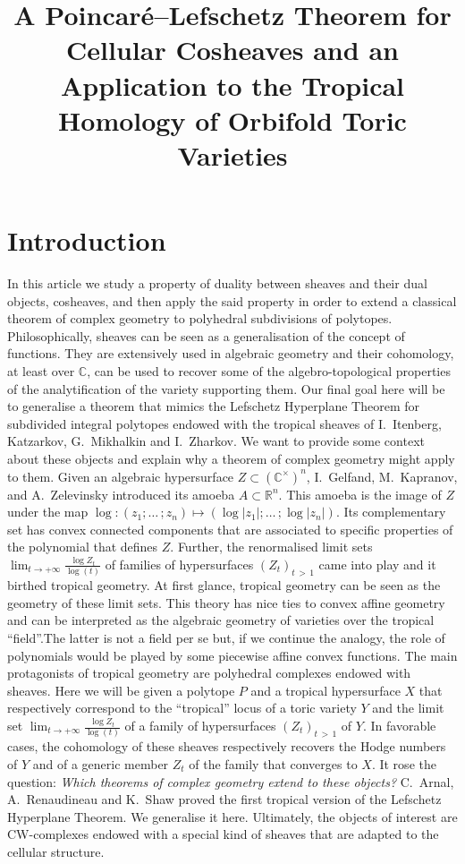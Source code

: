 \documentclass[AHL,Unicode,longabstracts,published]{cedram}
\title[Poincaré--Lefschetz duality and Tropical Homology]{A Poincaré--Lefschetz Theorem for Cellular Cosheaves and an Application to the Tropical Homology of Orbifold Toric Varieties}
\author[\initial{J.} \lastname{Chenal}]{\firstname{Jules} \lastname{Chenal}}
\newcommand{\C}{\mathbb{C}}
\newcommand{\R}{\mathbb{R}}
\begin{document}
\maketitle

\section{Introduction}

In this article we study a property of duality between sheaves and their dual objects, cosheaves, and then apply the said property in order to extend a classical theorem of complex geometry to polyhedral subdivisions of polytopes. Philosophically, sheaves can be seen as a generalisation of the concept of functions. They are extensively used in algebraic geometry and their cohomology, at least over $\C$, can be used to recover some of the algebro-topological properties of the analytification of the variety supporting them. Our final goal here will be to generalise a theorem that mimics the Lefschetz Hyperplane Theorem for subdivided integral polytopes endowed with the tropical sheaves of I.~Itenberg, Katzarkov, G.~Mikhalkin and I.~Zharkov.\linebreak
We want to provide some context about these objects and explain why a theorem of complex geometry might apply to them. Given an algebraic hypersurface $Z\subset(\C^\times)^n$, I.~Gelfand, M.~Kapranov, and A.~Zelevinsky introduced its amoeba $A\subset\R^n$. This amoeba is the image of $Z$ under the map $\log:(z_1;\dots\,;z_n)\mapsto (\log|z_1|;\dots\,;\log|z_n|)$. Its complementary set has convex connected components that are associated to specific properties of the polynomial that defines $Z$. Further, the renormalised limit sets $\lim_{t\to+\infty} \frac{\log Z_t}{\log(t)}$ of families of hypersurfaces $(Z_t)_{t\,>\,1}$ came into play and it birthed tropical geometry. At first glance, tropical geometry can be seen as the geometry of these limit sets. This theory has nice ties to convex affine geometry and can be interpreted as the algebraic geometry of varieties over the tropical ``field''.\linebreak The latter is not a field per se but, if we continue the analogy, the role of polynomials would be played by some piecewise affine convex functions. The main protagonists of tropical geometry are polyhedral complexes endowed with sheaves. Here we will be given a polytope $P$ and a tropical hypersurface $X$ that respectively correspond to the ``tropical'' locus of a toric variety $Y$ and the limit set $\lim_{t\to+\infty} \frac{\log Z_t}{\log(t)}$ of a family of hypersurfaces $(Z_t)_{t\,>\,1}$ of $Y$. In favorable cases, the cohomology of these sheaves respectively recovers the Hodge numbers of $Y$ and of a generic member $Z_t$ of the family that converges to $X$. It rose the question: \emph{Which theorems of complex geometry extend to these objects?} C.~Arnal, A.~Renaudineau and K.~Shaw proved the first tropical version of the Lefschetz Hyperplane Theorem. We generalise it here. Ultimately, the objects of interest are CW-complexes endowed with a special kind of sheaves that are adapted to the cellular structure.
\end{document}
